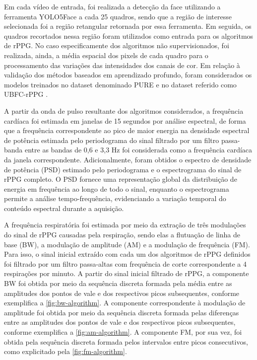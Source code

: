 Em cada vídeo de entrada, foi realizada a detecção da face utilizando a ferramenta YOLO5Face \cite{qi2022yolo5face} a cada 25 quadros, sendo que a região de interesse selecionada foi a região retangular retornada por essa ferramenta. Em seguida, os quadros recortados nessa região foram utilizados como entrada para os algoritmos de rPPG. No caso especificamente dos algoritmos não supervisionados, foi realizada, ainda, a média espacial dos pixels de cada quadro para o processamento das variações das intensidades dos canais de cor. Em relação à validação dos métodos baseados em aprendizado profundo, foram considerados os modelos treinados no dataset denominado PURE \cite{stricker2014pure} e no dataset referido como UBFC-rPPG \cite{bobbia2019unsupervised}.

A partir da onda de pulso resultante dos algoritmos considerados, a frequência cardíaca foi estimada em janelas de 15 segundos por análise espectral, de forma que a frequência correspondente ao pico de maior energia na densidade espectral de potência estimada pelo periodograma do sinal filtrado por um filtro passa-banda entre as bandas de 0,6 e 3,3 Hz foi considerada como a frequência cardíaca da janela correspondente. Adicionalmente, foram obtidos o espectro de densidade de potência (PSD) estimado pelo periodograma e o espectrograma do sinal de rPPG completo. O PSD fornece uma representação global da distribuição de energia em frequência ao longo de todo o sinal, enquanto o espectrograma permite a análise tempo-frequência, evidenciando a variação temporal do conteúdo espectral durante a aquisição.

A frequência respiratória foi estimada por meio da extração de três modulações do sinal de rPPG causadas pela respiração, sendo elas a flutuação de linha de base (BW), a modulação de amplitude (AM) e a modulação de frequência (FM). Para isso, o sinal inicial extraído com cada um dos algoritmos de rPPG definidos foi filtrado por um filtro passa-altas com frequência de corte correspondente a 4 respirações por minuto. A partir do sinal inicial filtrado de rPPG, a componente BW foi obtida por meio da sequência discreta formada pela média entre as amplitudes dos pontos de vale e dos respectivos picos subsequentes, conforme exemplifica a \autoref{fig:bw-algorithm}. A componente correspondente à modulação de amplitude foi obtida por meio da sequência discreta formada pelas diferenças entre as amplitudes dos pontos de vale e dos respectivos picos subsequentes, conforme exemplifica a \autoref{fig:am-algorithm}. A componente FM, por sua vez, foi obtida pela sequência discreta formada pelos intervalos entre picos consecutivos, como explicitado pela \autoref{fig:fm-algorithm}. 

